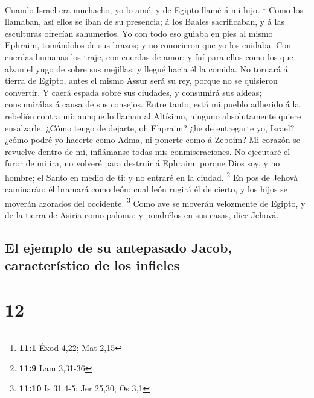  Cuando Israel era muchacho, yo lo amé, y de Egipto llamé á
mi hijo. \footnote{\textbf{11:1} Éxod 4,22; Mat 2,15}  Como
los llamaban, así ellos se iban de su presencia; á los Baales
sacrificaban, y á las esculturas ofrecían sahumerios.  Yo
con todo eso guiaba en pies al mismo Ephraim, tomándolos de sus brazos;
y no conocieron que yo los cuidaba.  Con cuerdas humanas los
traje, con cuerdas de amor: y fuí para ellos como los que alzan el yugo
de sobre sus mejillas, y llegué hacia él la comida.  No
tornará á tierra de Egipto, antes el mismo Assur será su rey, porque no
se quisieron convertir.  Y caerá espada sobre sus ciudades,
y consumirá sus aldeas; consumirálas á causa de sus consejos.
 Entre tanto, está mi pueblo adherido á la rebelión contra
mí: aunque lo llaman al Altísimo, ninguno absolutamente quiere
ensalzarle.  ¿Cómo tengo de dejarte, oh Ehpraim? ¿he de
entregarte yo, Israel? ¿cómo podré yo hacerte como Adma, ni ponerte como
á Zeboim? Mi corazón se revuelve dentro de mí, inflámanse todas mis
conmiseraciones.  No ejecutaré el furor de mi ira, no
volveré para destruir á Ephraim: porque Dios soy, y no hombre; el Santo
en medio de ti: y no entraré en la ciudad. \footnote{\textbf{11:9} Lam
  3,31-36}  En pos de Jehová caminarán: él bramará como
león: cual león rugirá él de cierto, y los hijos se moverán azorados del
occidente. \footnote{\textbf{11:10} Is 31,4-5; Jer 25,30; Os 3,1}
 Como ave se moverán velozmente de Egipto, y de la tierra
de Asiria como paloma; y pondrélos en sus casas, dice Jehová.

\hypertarget{el-ejemplo-de-su-antepasado-jacob-caracteruxedstico-de-los-infieles}{%
\subsection{El ejemplo de su antepasado Jacob, característico de los
infieles}\label{el-ejemplo-de-su-antepasado-jacob-caracteruxedstico-de-los-infieles}}

\hypertarget{section-11}{%
\section{12}\label{section-11}}

